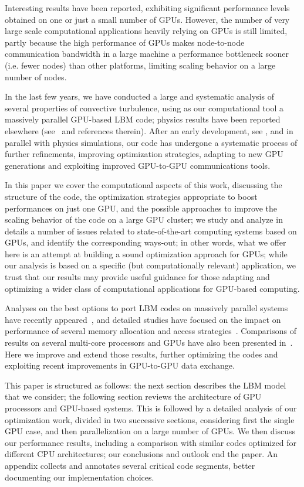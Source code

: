 \documentclass{elsarticle}
\begin{document}
Interesting results have been reported, exhibiting significant 
performance levels obtained on one or just a small number of GPUs. 
%
However, the number of very large scale computational applications heavily 
relying on GPUs is still limited, partly because the high performance of GPUs 
makes node-to-node communication bandwidth in a large machine a performance 
bottleneck sooner (i.e. fewer nodes) than other platforms, limiting scaling 
behavior on a large number of nodes.

In the last few years, we have conducted a large and systematic analysis 
of several properties of convective turbulence, using as our computational 
tool a massively parallel GPU-based LBM code; physics results have been 
reported elsewhere (see~\cite{ripesi14} and references therein).
% 
After an early development, see \cite{iccs10,ppam11}, and in parallel with 
physics simulations, our code has undergone a systematic process of further 
refinements, improving optimization strategies, adapting to new GPU generations 
and exploiting improved GPU-to-GPU communications tools. 

In this paper we cover the computational aspects of this work, discussing 
the structure of the code, the optimization strategies 
appropriate to boost performances on just one GPU, and the possible approaches 
to improve the scaling behavior of the code on a large GPU cluster; 
%
we study and analyze in details a number of issues related to state-of-the-art 
computing systems based on GPUs, and identify the corresponding ways-out;
%
in other words, what we offer here is an attempt at building a sound optimization 
approach for GPUs; while our analysis is based on a specific (but computationally 
relevant) application, we trust that our results may provide useful guidance 
for those adapting and optimizing a wider class of computational applications 
for GPU-based computing.

Analyses on the best options to port LBM codes on massively parallel systems 
have recently appeared~\cite{single-proc}, and detailed studies have focused on the
impact on performance of several memory allocation and access 
strategies~\cite{Pohl,Wittmann,shet1,shet2}. 
%
Comparisons of results on several multi-core processors and GPUs have also been 
presented in~\cite{sbac-pad13,iccs11,caf11,ppam13}. 
%
Here we improve and extend those results, further optimizing the codes and 
exploiting recent improvements in GPU-to-GPU data exchange.

This paper is structured as follows: the next section describes the LBM model
that we consider; the following section reviews the architecture of GPU
processors and GPU-based systems. This is followed  by a detailed analysis of
our optimization work, divided in two successive  sections, considering first
the single GPU case, and  then parallelization on a large number of GPUs. We
then discuss  our performance results, including a comparison with
similar codes  optimized for different CPU architectures; our conclusions  and
outlook end the paper. An appendix collects and annotates several critical
code segments, better documenting our implementation choices.
\end{document}
